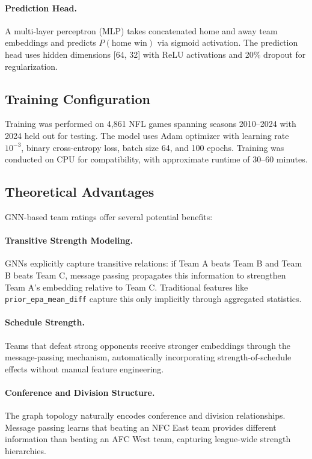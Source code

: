 \paragraph{Prediction Head.}
A multi-layer perceptron (MLP) takes concatenated home and away team embeddings and predicts $P(\text{home win})$ via sigmoid activation. The prediction head uses hidden dimensions [64, 32] with ReLU activations and 20\% dropout for regularization.

\subsection{Training Configuration}
Training was performed on 4,861 NFL games spanning seasons 2010--2024 with 2024 held out for testing. The model uses Adam optimizer with learning rate $10^{-3}$, binary cross-entropy loss, batch size 64, and 100 epochs. Training was conducted on CPU for compatibility, with approximate runtime of 30--60 minutes.

\subsection{Theoretical Advantages}
GNN-based team ratings offer several potential benefits:

\paragraph{Transitive Strength Modeling.}
GNNs explicitly capture transitive relations: if Team A beats Team B and Team B beats Team C, message passing propagates this information to strengthen Team A's embedding relative to Team C. Traditional features like \texttt{prior\_epa\_mean\_diff} capture this only implicitly through aggregated statistics.

\paragraph{Schedule Strength.}
Teams that defeat strong opponents receive stronger embeddings through the message-passing mechanism, automatically incorporating strength-of-schedule effects without manual feature engineering.

\paragraph{Conference and Division Structure.}
The graph topology naturally encodes conference and division relationships. Message passing learns that beating an NFC East team provides different information than beating an AFC West team, capturing league-wide strength hierarchies.

